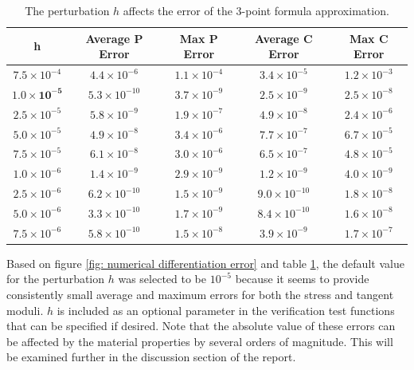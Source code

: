 \documentclass[]{spie}  %
\newcommand\Tstrut{\rule{0pt}{2.6ex}}         %
\begin{document}
\begin{table}[h]
	\centering
	\caption{The perturbation $h$ affects the error of the 3-point formula approximation.}
	\begin{tabular}{ | c | c | c | c | c | }
		\hline
		h & Average P Error & Max P Error & Average C Error & Max C Error \Tstrut \\ \hline
		$7.5 \times 10^{-4}$ & $4.4 \times 10^{-6}$  & $1.1 \times 10^{-4}$ & $3.4 \times 10^{-5}$ & $1.2 \times 10^{-3}$ \Tstrut \\
		$\bm{1.0 \times 10^{-5}}$ & $5.3 \times 10^{-10}$ & $3.7 \times 10^{-9}$ & $2.5 \times 10^{-9}$ & $2.5 \times 10^{-8}$ \\
		$2.5 \times 10^{-5}$ & $5.8 \times 10^{-9}$  & $1.9 \times 10^{-7}$ & $4.9 \times 10^{-8}$ & $2.4 \times 10^{-6}$ \\
		$5.0 \times 10^{-5}$ & $4.9 \times 10^{-8}$  & $3.4 \times 10^{-6}$ & $7.7 \times 10^{-7}$ & $6.7 \times 10^{-5}$ \\
		$7.5 \times 10^{-5}$ & $6.1 \times 10^{-8}$  & $3.0 \times 10^{-6}$ & $6.5 \times 10^{-7}$ & $4.8 \times 10^{-5}$ \\
		$1.0 \times 10^{-6}$ & $1.4 \times 10^{-9}$  & $2.9 \times 10^{-9}$ & $1.2 \times 10^{-9}$ & $4.0 \times 10^{-9}$ \\
		$2.5 \times 10^{-6}$ & $6.2 \times 10^{-10}$ & $1.5 \times 10^{-9}$ & $9.0 \times 10^{-10}$& $1.8 \times 10^{-8}$ \\
		$5.0 \times 10^{-6}$ & $3.3 \times 10^{-10}$ & $1.7 \times 10^{-9}$ & $8.4 \times 10^{-10}$& $1.6 \times 10^{-8}$ \\
		$7.5 \times 10^{-6}$ & $5.8 \times 10^{-10}$ & $1.5 \times 10^{-8}$ & $3.9 \times 10^{-9}$ & $1.7 \times 10^{-7}$ \\
		\hline
	\end{tabular}
	\label{table: h vs. error}
\end{table}

Based on figure \ref{fig: numerical differentiation error} and table \ref{table: h vs. error}, the default value for the perturbation $h$ was selected to be $10^{-5}$ because it seems to provide consistently small average and maximum errors for both the stress and tangent moduli. $h$ is included as an optional parameter in the verification test functions that can be specified if desired. Note that the absolute value of these errors can be affected by the material properties by several orders of magnitude. This will be examined further in the discussion section of the report.
\end{document}
